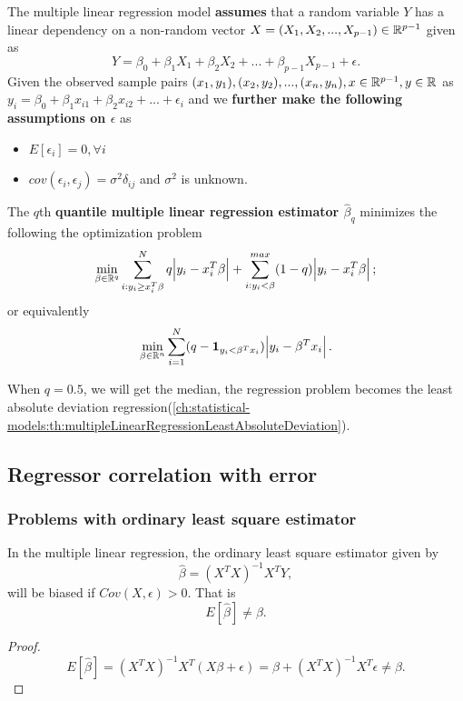 \begin{refsection}
\begin{definition}\cite[87]{cameron2005microeconometrics} 
	The multiple linear regression model \textbf{assumes} that a random variable $Y$ has a linear dependency on a non-random vector $X = (X_1,X_2,...,X_{p-1}) \in \mathbb{R}^{p-1}$ given as
	$$Y = \beta_0 + \beta_1 X_1 +\beta_2 X_2 + ... +\beta_{p-1} X_{p-1} + \epsilon.$$
	Given the observed sample pairs $(x_1,y_1),(x_2,y_2),..., (x_n,y_n), x\in \mathbb{R}^{p-1}, y\in \mathbb{R}$ as $y_i = \beta_0 + \beta_1 x_{i1} + \beta_2 x_{i2} + ... + \epsilon_i$ and we \textbf{further make the following assumptions on $\epsilon$} as
	\begin{itemize}
		\item $E[\epsilon_i] = 0,\forall i$
		\item $cov(\epsilon_i,\epsilon_j) = \sigma^2\delta_{ij}$ and $\sigma^2$ is unknown.
	\end{itemize} 	
	
The $q$th \textbf{quantile multiple linear regression estimator $\hat{\beta}_q$} minimizes the following the optimization problem
$$\min_{\beta \in \mathbb{R}^q} \sum_{i:y_i\geq x_i^T\beta}^{N} q\abs{y_i-x_i^T\beta} + \sum_{i:y_i < \beta}^{max}(1-q)\abs{y_i-x_i^T\beta};$$
or equivalently
$$\min_{\beta \in \mathbb{R}^n} \sum_{i=1}^{N} (q-\bm{1}_{y_i<\beta^Tx_i})\abs{y_i-\beta^Tx_i}.$$

\end{definition}

\begin{remark}
When $q = 0.5$, we will get the median, the regression problem becomes the least absolute deviation regression(\autoref{ch:statistical-models:th:multipleLinearRegressionLeastAbsoluteDeviation}). 
\end{remark}


\subsection{Regressor correlation with error}

\subsubsection{Problems with ordinary least square estimator}

\begin{lemma}
In the multiple linear regression, the ordinary least square estimator given by
$$\hat{\beta} = (X^TX)^{-1}X^TY,$$
will be biased if $Cov(X,\epsilon) > 0.$
That is
$$E[\hat{\beta}] \neq \beta.$$	
\end{lemma}
\begin{proof}
$$E[\hat{\beta}] = (X^TX)^{-1}X^T(X\beta+\epsilon) = \beta + (X^TX)^{-1}X^T\epsilon\neq \beta.$$	
\end{proof}


\end{refsection}
